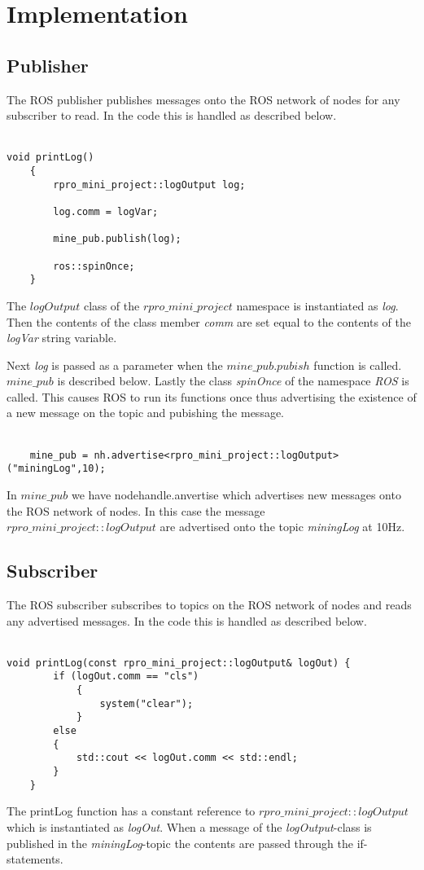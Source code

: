 \chapter{Implementation}

\section{Publisher}
The ROS publisher publishes messages onto the ROS network of nodes for any subscriber to read. In the code this is handled as described below.\\
\\
\begin{lstlisting}
void printLog()
    {
        rpro_mini_project::logOutput log;

        log.comm = logVar;

        mine_pub.publish(log);

        ros::spinOnce;
    }     
\end{lstlisting}
The $logOutput$ class of the $rpro\_mini\_project$ namespace is instantiated as \textit{log}. Then the contents of the class member \textit{comm} are set equal to the contents of the \textit{logVar} string variable.

Next \textit{log} is passed as a parameter when the $mine\_pub.pubish$ function is called. $mine\_pub$ is described below. Lastly the class \textit{spinOnce} of the namespace \textit{ROS} is called. This causes ROS to run its functions once thus advertising the existence of a new message on the topic and pubishing the message.\\
\\
\begin{lstlisting}
    mine_pub = nh.advertise<rpro_mini_project::logOutput>("miningLog",10);
\end{lstlisting}
In $mine\_pub$ we have nodehandle.anvertise which advertises new messages onto the ROS network of nodes. In this case the message $rpro\_mini\_project::logOutput$ are advertised onto the topic \textit{miningLog} at 10Hz.

\newpage

\section{Subscriber}
The ROS subscriber subscribes to topics on the ROS network of nodes and reads any advertised messages. In the code this is handled as described below.\\
\\
\begin{lstlisting}
void printLog(const rpro_mini_project::logOutput& logOut) {
        if (logOut.comm == "cls")
            {
                system("clear");
            }
        else
        {
            std::cout << logOut.comm << std::endl;
        }
    }
\end{lstlisting}
The printLog function has a constant reference to $rpro\_mini\_project::logOutput$ which is instantiated as \textit{logOut}. When a message of the \textit{logOutput}-class is published in the \textit{miningLog}-topic the contents are passed through the if-statements.

